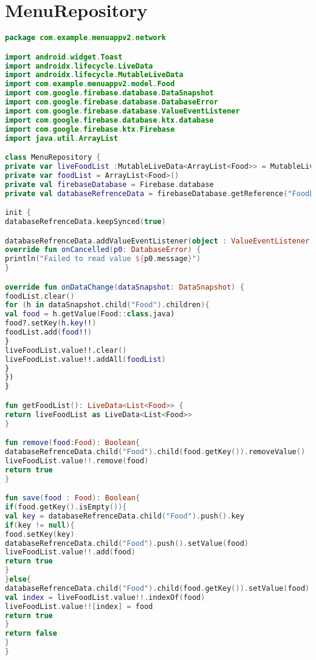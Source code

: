\section{MenuRepository}
\begin{lstlisting}[caption= MenuRepository.kt , language=Kotlin]
package com.example.menuappv2.network

import android.widget.Toast
import androidx.lifecycle.LiveData
import androidx.lifecycle.MutableLiveData
import com.example.menuappv2.model.Food
import com.google.firebase.database.DataSnapshot
import com.google.firebase.database.DatabaseError
import com.google.firebase.database.ValueEventListener
import com.google.firebase.database.ktx.database
import com.google.firebase.ktx.Firebase
import java.util.ArrayList

class MenuRepository {
private var liveFoodList :MutableLiveData<ArrayList<Food>> = MutableLiveData<ArrayList<Food>>(arrayListOf())
private var foodList = ArrayList<Food>()
private val firebaseDatabase = Firebase.database
private val databaseRefrenceData = firebaseDatabase.getReference("FoodList")

init {
databaseRefrenceData.keepSynced(true)

databaseRefrenceData.addValueEventListener(object : ValueEventListener {
override fun onCancelled(p0: DatabaseError) {
println("Failed to read value ${p0.message}")
}

override fun onDataChange(dataSnapshot: DataSnapshot) {
foodList.clear()
for (h in dataSnapshot.child("Food").children){
val food = h.getValue(Food::class.java)
food?.setKey(h.key!!)
foodList.add(food!!)
}
liveFoodList.value!!.clear()
liveFoodList.value!!.addAll(foodList)
}
})
}

fun getFoodList(): LiveData<List<Food>> {
return liveFoodList as LiveData<List<Food>>
}

fun remove(food:Food): Boolean{
databaseRefrenceData.child("Food").child(food.getKey()).removeValue()
liveFoodList.value!!.remove(food)
return true
}

fun save(food : Food): Boolean{
if(food.getKey().isEmpty()){
val key = databaseRefrenceData.child("Food").push().key
if(key != null){
food.setKey(key)
databaseRefrenceData.child("Food").push().setValue(food)
liveFoodList.value!!.add(food)
return true
}
}else{
databaseRefrenceData.child("Food").child(food.getKey()).setValue(food)
val index = liveFoodList.value!!.indexOf(food)
liveFoodList.value!![index] = food
return true
}
return false
}
}
\end{lstlisting}


